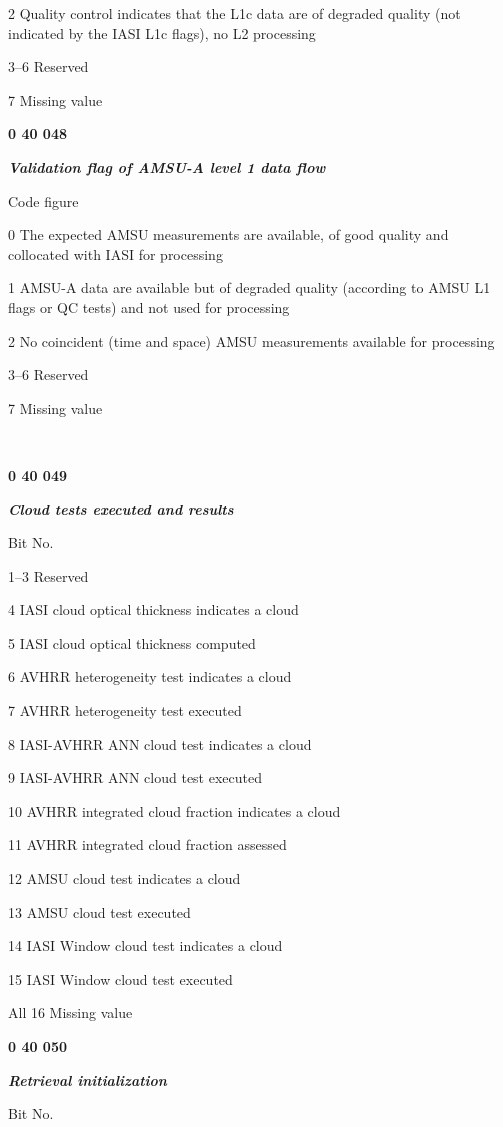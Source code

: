 2 Quality control indicates that the L1c data are of degraded quality (not indicated by the IASI L1c flags), no L2 processing

3--6 Reserved

7 Missing value

\textbf{0 40 048}

\emph{\textbf{Validation flag of AMSU-A level 1 data flow}}

Code figure

0 The expected AMSU measurements are available, of good quality and collocated with IASI for processing

1 AMSU-A data are available but of degraded quality (according to AMSU L1 flags or QC tests) and not used for processing

2 No coincident (time and space) AMSU measurements available for processing

3--6 Reserved

7 Missing value

\textbf{\\
}

\textbf{0 40 049}

\emph{\textbf{Cloud tests executed and results}}

Bit No.

1--3 Reserved

4 IASI cloud optical thickness indicates a cloud

5 IASI cloud optical thickness computed

6 AVHRR heterogeneity test indicates a cloud

7 AVHRR heterogeneity test executed

8 IASI-AVHRR ANN cloud test indicates a cloud

9 IASI-AVHRR ANN cloud test executed

10 AVHRR integrated cloud fraction indicates a cloud

11 AVHRR integrated cloud fraction assessed

12 AMSU cloud test indicates a cloud

13 AMSU cloud test executed

14 IASI Window cloud test indicates a cloud

15 IASI Window cloud test executed

All 16 Missing value

\textbf{0 40 050}

\emph{\textbf{Retrieval initialization}}

Bit No.

